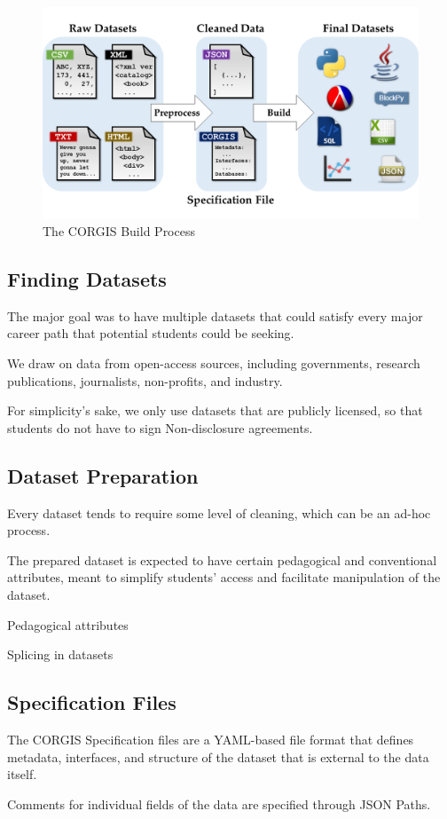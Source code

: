 \documentclass{sig-alternate}
\begin{document}
\begin{figure}[h]
    \centering
    \includegraphics[width=.5\textwidth]{graphics/process}
    \caption{The CORGIS Build Process}
    \label{fig:corgis-build}
\end{figure}

\subsection{Finding Datasets}

The major goal was to have multiple datasets that could satisfy every major career path that potential students could be seeking.

We draw on data from open-access sources, including governments, research publications, journalists, non-profits, and industry.

For simplicity's sake, we only use datasets that are publicly licensed, so that students do not have to sign Non-disclosure agreements.

\subsection{Dataset Preparation}

Every dataset tends to require some level of cleaning, which can be an ad-hoc process.

The prepared dataset is expected to have certain pedagogical and conventional attributes, meant to simplify students' access and facilitate manipulation of the dataset.

Pedagogical attributes

Splicing in datasets


\subsection{Specification Files}

The CORGIS Specification files are a YAML-based file format that defines metadata, interfaces, and structure of the dataset that is external to the data itself.

Comments for individual fields of the data are specified through JSON Paths.
\end{document}
